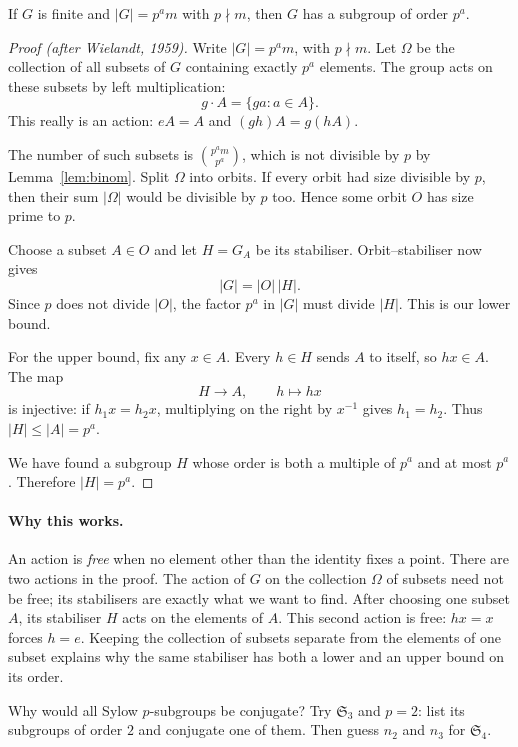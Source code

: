 \begin{theorem}[Sylow I]\label{thm:sylow1}
If $G$ is finite and $|G|=p^a m$ with $p\nmid m$, then $G$ has a subgroup of order $p^a$.
\end{theorem}
\begin{proof}[Proof (after Wielandt, 1959)]
Write $|G|=p^a m$, with $p\nmid m$. Let $\Omega$ be the collection of all subsets of $G$ containing exactly $p^a$ elements. The group acts on these subsets by left multiplication:
\[
g\cdot A=\{ga:a\in A\}.
\]
This really is an action: $eA=A$ and $(gh)A=g(hA)$.

The number of such subsets is $\binom{p^am}{p^a}$, which is not divisible by $p$ by Lemma~\ref{lem:binom}. Split $\Omega$ into orbits. If every orbit had size divisible by $p$, then their sum $|\Omega|$ would be divisible by $p$ too. Hence some orbit $O$ has size prime to $p$.

Choose a subset $A\in O$ and let $H=G_A$ be its stabiliser. Orbit--stabiliser now gives
\[
|G|=|O|\,|H|.
\]
Since $p$ does not divide $|O|$, the factor $p^a$ in $|G|$ must divide $|H|$. This is our lower bound.

For the upper bound, fix any $x\in A$. Every $h\in H$ sends $A$ to itself, so $hx\in A$. The map
\[
H\longrightarrow A,\qquad h\longmapsto hx
\]
is injective: if $h_1x=h_2x$, multiplying on the right by $x^{-1}$ gives $h_1=h_2$. Thus $|H|\le|A|=p^a$.

We have found a subgroup $H$ whose order is both a multiple of $p^a$ and at most $p^a$. Therefore $|H|=p^a$.
\end{proof}

\paragraph{Why this works.}
An action is \emph{free} when no element other than the identity fixes a point. There are two actions in the proof. The action of $G$ on the collection $\Omega$ of subsets need not be free; its stabilisers are exactly what we want to find. After choosing one subset $A$, its stabiliser $H$ acts on the elements of $A$. This second action is free: $hx=x$ forces $h=e$. Keeping the collection of subsets separate from the elements of one subset explains why the same stabiliser has both a lower and an upper bound on its order.

\begin{think}
Why would all Sylow $p$-subgroups be conjugate? Try $\mathfrak S_3$ and $p=2$: list its subgroups of order $2$ and conjugate one of them. Then guess $n_2$ and $n_3$ for $\mathfrak S_4$.
\end{think}

